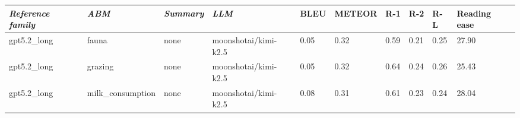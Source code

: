 \begin{tabular}{|l|l|l|l|l|l|l|l|l|l|}
\hline
\textit{\textbf{Reference family}} & \textit{\textbf{ABM}} & \textit{\textbf{Summary}} & \textit{\textbf{LLM}} & BLEU & METEOR & R-1 & R-2 & R-L & Reading ease \\
 \hline
 gpt5.2\_long & fauna & none & moonshotai/kimi-k2.5 & 0.05 & 0.32 & 0.59 & 0.21 & 0.25 & 27.90 \\
 \hline
 gpt5.2\_long & grazing & none & moonshotai/kimi-k2.5 & 0.05 & 0.32 & 0.64 & 0.24 & 0.26 & 25.43 \\
 \hline
 gpt5.2\_long & milk\_consumption & none & moonshotai/kimi-k2.5 & 0.08 & 0.31 & 0.61 & 0.23 & 0.24 & 28.04 \\
\hline
\end{tabular}
